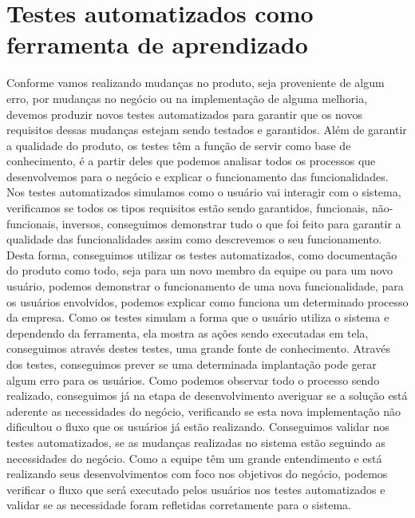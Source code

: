     \section{Testes automatizados como ferramenta de aprendizado}
      Conforme vamos realizando mudanças no produto, seja proveniente de algum erro,
      por mudanças no negócio ou na implementação de alguma melhoria, devemos produzir
      novos testes automatizados para garantir que os novos requisitos dessas mudanças
      estejam sendo testados e garantidos. \newline
      Além de garantir a qualidade do produto, os testes têm a função de servir
      como base de conhecimento, é a partir deles que podemos analisar todos os
      processos que desenvolvemos para o negócio e explicar o funcionamento das
      funcionalidades. Nos testes automatizados simulamos como o usuário vai
      interagir com o sistema, verificamos se todos os tipos requisitos estão
      sendo garantidos, funcionais, não-funcionais, inversos, conseguimos demonstrar
      tudo o que foi feito para garantir a qualidade das funcionalidades assim
      como descrevemos o seu funcionamento. Desta forma, conseguimos utilizar os
      testes automatizados, como documentação do produto como todo, seja para um
      novo membro da equipe ou para um novo usuário, podemos demonstrar o funcionamento
      de uma nova funcionalidade, para os usuários envolvidos, podemos explicar
      como funciona um determinado processo da empresa. Como os testes simulam
      a forma que o usuário utiliza o sistema e dependendo da ferramenta, ela
      mostra as ações sendo executadas em tela, conseguimos através destes testes,
      uma grande fonte de conhecimento. Através dos testes, conseguimos prever se
      uma determinada implantação pode gerar algum erro para os usuários. Como
      podemos observar todo o processo sendo realizado, conseguimos já na etapa
      de desenvolvimento averiguar se a solução está aderente as necessidades do
      negócio, verificando se esta nova implementação não dificultou o fluxo que
      os usuários já estão realizando. Conseguimos validar nos testes automatizados,
      se as mudanças realizadas no sistema estão seguindo as necessidades do negócio.
      Como a equipe têm um grande entendimento e está realizando seus desenvolvimentos
      com foco nos objetivos do negócio, podemos verificar o fluxo que será executado
      pelos usuários nos testes automatizados e validar se as necessidade foram
      refletidas corretamente para o sistema. \newline
